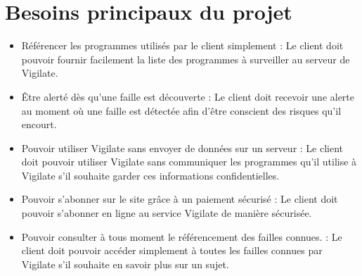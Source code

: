 \section{Besoins principaux du projet}
\begin{itemize}
\item Référencer les programmes utilisés par le client simplement : Le client doit pouvoir fournir facilement la liste des programmes à surveiller au serveur de Vigilate.
\item Être alerté dès qu'une faille est découverte : Le client doit recevoir une alerte au moment où une faille est détectée afin d'être conscient des risques qu'il encourt.
\item Pouvoir utiliser Vigilate sans envoyer de données sur un serveur : Le client doit pouvoir utiliser Vigilate sans communiquer les programmes qu'il utilise à Vigilate s'il souhaite garder ces informations confidentielles.
\item Pouvoir s'abonner sur le site grâce à un paiement sécurisé : Le client doit pouvoir s'abonner en ligne au service Vigilate de manière sécurisée.
\item Pouvoir consulter à tous moment le référencement des failles connues. : Le client doit pouvoir accéder simplement à toutes les failles connues par Vigilate s'il souhaite en savoir plus sur un sujet.
\end{itemize}

